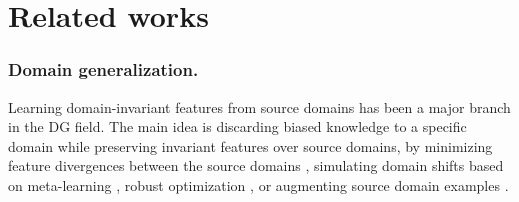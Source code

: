 \section{Related works}

\subsubsection{Domain generalization.}
Learning domain-invariant features from source domains has been a major branch in the DG field. The main idea is discarding biased knowledge to a specific domain while preserving invariant features over source domains, by minimizing feature divergences between the source domains \cite{muandet2013icml_DIFL,ganin2016dann,li2018mmd,sun2016coral,matsuura2020aaai_mixture_mld,li2018cdann,zhao2020er_entropy_regularization}, simulating domain shifts based on meta-learning \cite{li2018mldg,balaji2018metareg,dou2019masf,li2019episodic_epi-fcr,zhang2020arm,bui2021mdsdi}, robust optimization \cite{arjovsky2019irm,krueger2020vrex,Sagawa2020GroupDRO, shi2022gradient,cha2021swad}, or augmenting source domain examples \cite{nuriel2020padain,zhou2021mixstyle,nam2019sagnet,carlucci2019jigsaw_jigen,zhou2020l2a_ot,bai2020decaug,robey2021mbdg_model_based_domain_generalization,yang2021atsl_adversarial_teacher_student_learning}.
